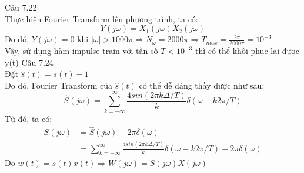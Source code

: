 \documentclass[11pt]{exam}
\begin{document}
\begin{questions}
\question Câu 7.22 \\
    Thực hiện Fourier Transform lên phương trình, ta có:
    \begin{equation*}
        Y(j\omega) = X_1(j\omega)X_2(j\omega)
    \end{equation*}
    Do đó, $Y(j\omega) = 0$ khi $|\omega| > 1000\pi \Rightarrow N_{\omega} = 2000\pi \Rightarrow T_{max} = \frac{2\pi}{2000\pi} = 10^{-3}$ \\
    Vậy, sử dụng hàm impulse train với tần số $T < 10^{-3}$ thì có thể khôi phục lại được y(t)
\question Câu 7.24 \\
    Đặt $\hat{s}(t) = s(t) - 1$ \\
    Do đó, Fourier Transform của $\hat{s}(t)$ có thể dễ dàng thầy được như sau:
    \begin{equation*}
        \hat{S}(j\omega) = \sum_{k = -\infty}^{\infty}{\frac{4sin(2\pi k\Delta/T)}{k}\delta(\omega - k2\pi/T)}
    \end{equation*}
    Từ đó, ta có:
    \begin{equation*}
        \begin{aligned}
            S(j\omega) &= \hat{S}(j\omega) - 2\pi\delta(\omega) \\
            &= \sum_{k = -\infty}^{\infty}{\frac{4sin(2\pi k\Delta/T)}{k}\delta(\omega - k2\pi/T)} - 2\pi\delta(\omega)
        \end{aligned}
    \end{equation*}
    Do $w(t) = s(t)x(t) \Rightarrow W(j\omega) = S(j\omega)X(j\omega)$ \\
\end{questions}
\end{document}
